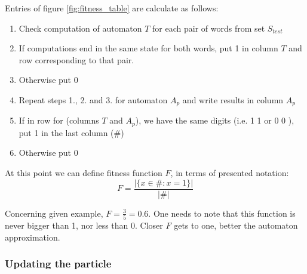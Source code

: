 \documentclass{article}
\begin{document}

Entries of figure \ref{fig:fitness_table} are calculate as follows:
\begin{enumerate}
\item Check computation of automaton $T$ for each pair of words from set $S_{test}$
\item If computations end in the same state for both words, put 1 in column $T$ and row corresponding to that pair.
\item Otherwise put 0
\item Repeat steps 1., 2. and 3. for automaton $A_p$ and write results in column $A_p$
\item If in row for (columns $T$ and $A_p$), we have the same digits (i.e. 1 1 or 0 0 ), put 1 in the last column ($\#$)
\item Otherwise put 0
\end{enumerate}

At this point we can define fitness function $F$, in terms of presented notation:
\[
	F = \frac{|\{x \in \# : x = 1 \}|}{|\#|}
\]



Concerning given example, $F = \frac{3}{5} = 0.6$. One needs to note that this function is never bigger than 1, nor less than 0. Closer $F$ gets to one, better the automaton approximation. 
\subsubsection{Updating the particle}




%
\end{document}

